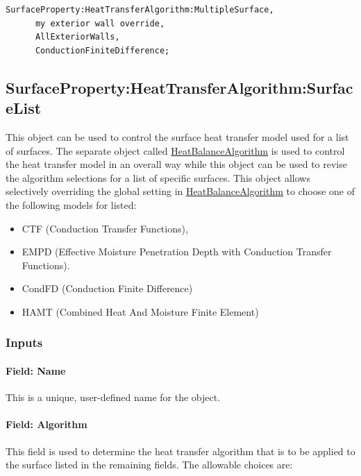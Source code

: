 \begin{lstlisting}
SurfaceProperty:HeatTransferAlgorithm:MultipleSurface,
      my exterior wall override,
      AllExteriorWalls,
      ConductionFiniteDifference;
\end{lstlisting}

\subsection{SurfaceProperty:HeatTransferAlgorithm:SurfaceList}\label{surfacepropertyheattransferalgorithmsurfacelist}

This object can be used to control the surface heat transfer model used for a list of surfaces. The separate object called \hyperref[heatbalancealgorithm]{HeatBalanceAlgorithm} is used to control the heat transfer model in an overall way while this object can be used to revise the algorithm selections for a list of specific surfaces. This object allows selectively overriding the global setting in \hyperref[heatbalancealgorithm]{HeatBalanceAlgorithm} to choose one of the following models for listed:

\begin{itemize}
\item
  CTF (Conduction Transfer Functions),
\item
  EMPD (Effective Moisture Penetration Depth with Conduction Transfer Functions).
\item
  CondFD (Conduction Finite Difference)
\item
  HAMT (Combined Heat And Moisture Finite Element)
\end{itemize}

\subsubsection{Inputs}\label{inputs-2-000}

\paragraph{Field: Name}

This is a unique, user-defined name for the object.

\paragraph{Field: Algorithm}\label{field-algorithm-2}

This field is used to determine the heat transfer algorithm that is to be applied to the surface listed in the remaining fields. The allowable choices are:

